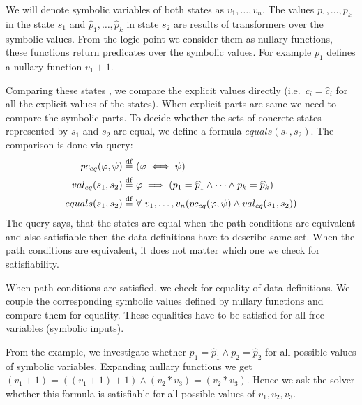 We will denote symbolic variables of both states as $v_1, \dots, v_n$. The
values $p_1, \dots, p_k$ in the state $s_1$ and $\widehat{p}_1, \dots,
\widehat{p}_k$ in state $s_2$ are results of transformers over the symbolic
values. From the logic point we consider them as nullary functions, these
functions return predicates over the symbolic values. For example $p_1$ defines
a nullary function $v_1 + 1$.

Comparing these states , we compare the explicit values directly (i.e.~$c_i =
\widehat{c}_i$ for all the explicit values of the states).  When explicit parts
are same we need to compare the symbolic parts.
To decide whether the sets of
concrete states represented by $s_1$ and $s_2$ are equal, we define a formula
$equals(s_1, s_2)$. The comparison is done via \SMT query:
\begin{equation*}
\begin{aligned}
    pc_{eq}(\varphi, \psi) \stackrel{\mathrm{df}}{=} & ~(\varphi \iff \psi) \\
    val_{eq}(s_1, s_2) \stackrel{\mathrm{df}}{=} & ~\varphi \implies (p_1 = \widehat{p}_1 \wedge \dots \wedge p_k = \widehat{p}_k ) \\
    equals(s_1, s_2) \stackrel{\mathrm{df}}{=} & ~\forall~v_1,\dots, v_n (pc_{eq}(\varphi, \psi)
    \wedge val_{eq}(s_1, s_2))
\end{aligned}
\end{equation*}
The query says, that the states are equal when the path conditions are
equivalent and also satisfiable then the data definitions have to describe same
set. When the path conditions are equivalent, it does not matter which one we
check for satisfiability.

When path conditions are satisfied, we check for equality of data
definitions. We couple the corresponding symbolic values defined by nullary
functions and compare them for equality. These equalities have to be satisfied
for all free variables (symbolic inputs).

From the example, we investigate whether $p_1 = \widehat{p}_1 \wedge p_2 =
\widehat{p}_2$ for all possible values of symbolic variables. Expanding nullary
functions we get $(v_1 + 1) = ((v_1 + 1) + 1) \wedge (v_2 * v_3) = (v_2 * v_3)$. Hence
we ask the \SMT solver whether this formula is satisfiable for all possible
values of $v_1, v_2, v_3$.

